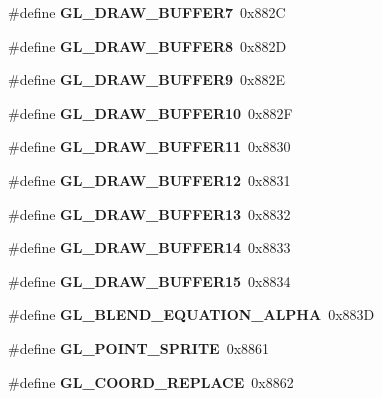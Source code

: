 \begin{DoxyCompactItemize}
\item 
\#define {\bfseries G\+L\+\_\+\+D\+R\+A\+W\+\_\+\+B\+U\+F\+F\+E\+R7}~0x882\+C\label{_s_d_l__opengl_8h_a0785682bd6abfebf09c7d9824e9e0c5b}

\item 
\#define {\bfseries G\+L\+\_\+\+D\+R\+A\+W\+\_\+\+B\+U\+F\+F\+E\+R8}~0x882\+D\label{_s_d_l__opengl_8h_ab4c4e3ed6fa6175de281ffca5447e44c}

\item 
\#define {\bfseries G\+L\+\_\+\+D\+R\+A\+W\+\_\+\+B\+U\+F\+F\+E\+R9}~0x882\+E\label{_s_d_l__opengl_8h_a2f5f605eddcf20b6e45962a51533d420}

\item 
\#define {\bfseries G\+L\+\_\+\+D\+R\+A\+W\+\_\+\+B\+U\+F\+F\+E\+R10}~0x882\+F\label{_s_d_l__opengl_8h_a442e587e94fbac12a5295a511215183e}

\item 
\#define {\bfseries G\+L\+\_\+\+D\+R\+A\+W\+\_\+\+B\+U\+F\+F\+E\+R11}~0x8830\label{_s_d_l__opengl_8h_a3dff209c91c5e127ec86e459ca6ad46a}

\item 
\#define {\bfseries G\+L\+\_\+\+D\+R\+A\+W\+\_\+\+B\+U\+F\+F\+E\+R12}~0x8831\label{_s_d_l__opengl_8h_a061a16dbc7b68f091e1903067b929067}

\item 
\#define {\bfseries G\+L\+\_\+\+D\+R\+A\+W\+\_\+\+B\+U\+F\+F\+E\+R13}~0x8832\label{_s_d_l__opengl_8h_abdbe6e924fa1252fbd9d67e292d4b93e}

\item 
\#define {\bfseries G\+L\+\_\+\+D\+R\+A\+W\+\_\+\+B\+U\+F\+F\+E\+R14}~0x8833\label{_s_d_l__opengl_8h_a819521c69534374257cebeb5e2025d55}

\item 
\#define {\bfseries G\+L\+\_\+\+D\+R\+A\+W\+\_\+\+B\+U\+F\+F\+E\+R15}~0x8834\label{_s_d_l__opengl_8h_a46467585334deca0ddc280cfdff4965e}

\item 
\#define {\bfseries G\+L\+\_\+\+B\+L\+E\+N\+D\+\_\+\+E\+Q\+U\+A\+T\+I\+O\+N\+\_\+\+A\+L\+P\+H\+A}~0x883\+D\label{_s_d_l__opengl_8h_a85a60a922c2e2abe0838e20bbcc7dbf2}

\item 
\#define {\bfseries G\+L\+\_\+\+P\+O\+I\+N\+T\+\_\+\+S\+P\+R\+I\+T\+E}~0x8861\label{_s_d_l__opengl_8h_aa9c2d29fbaccd5badfc18959375c7d74}

\item 
\#define {\bfseries G\+L\+\_\+\+C\+O\+O\+R\+D\+\_\+\+R\+E\+P\+L\+A\+C\+E}~0x8862\label{_s_d_l__opengl_8h_a629de8cb4586f47cc1fb687961b98dd3}


\end{DoxyCompactItemize}
